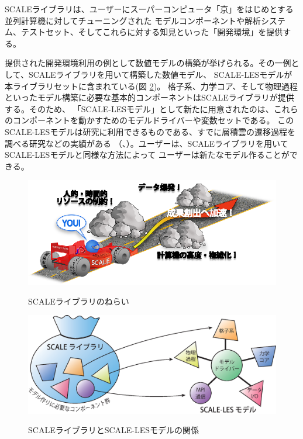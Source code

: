 SCALEライブラリは、ユーザーにスーパーコンピュータ「京」をはじめとする並列計算機に対してチューニングされた
モデルコンポーネントや解析システム、テストセット、そしてこれらに対する知見といった「開発環境」を提供する。

提供された開発環境利用の例として数値モデルの構築が挙げられる。その一例として、SCALEライブラリを用いて構築した数値モデル、
SCALE-LESモデルが本ライブラリセットに含まれている(図 \ref{fig:scale-les})。
格子系、力学コア、そして物理過程といったモデル構築に必要な基本的コンポーネントはSCALEライブラリが提供する。そのため、
「SCALE-LESモデル」として新たに用意されたのは、これらのコンポーネントを動かすためのモデルドライバーや変数セットである。
このSCALE-LESモデルは研究に利用できるものである、すでに層積雲の遷移過程を調べる研究などの実績がある
（\cite{satoy_2014}、\cite{satoy_2015}）。ユーザーは、SCALEライブラリを用いてSCALE-LESモデルと同様な方法によって
ユーザーは新たなモデル作ることができる。


\begin{figure}[th]
\begin{center}
  \includegraphics[width=0.9\hsize]{./figure/library.eps}\\
  \caption{SCALEライブラリのねらい}
  \label{fig:scale}
\end{center}
\end{figure}

\begin{figure}[th]
\begin{center}
  \includegraphics[width=0.9\hsize]{./figure/scale_and_scale-les.eps}\\
  \caption{SCALEライブラリとSCALE-LESモデルの関係}
  \label{fig:scale-les}
\end{center}
\end{figure}


